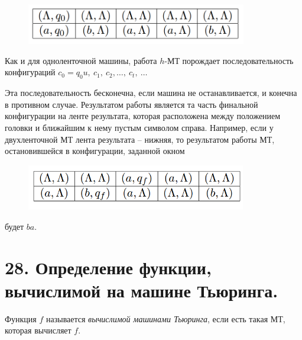 \begin{figure}[h]
	\begin{center}
		\begin{minipage}[h]{0.6\linewidth}
			\includegraphics[height=1.75cm, width=\linewidth]{images/TabMT.png}
		\end{minipage}
	\end{center}
\end{figure}

Как и для одноленточной машины, работа $h$-МТ порождает последовательность конфигураций $c_0 = q_0u,\ c_1,\ c_2, \ldots ,\ c_t,\ \ldots$

Эта последовательность бесконечна, если машина не останавливается, и конечна в противном случае. Результатом работы является та часть финальной конфигурации на ленте результата, которая расположена между положением головки и ближайшим к нему пустым символом справа. Например, если у двухленточной МТ
лента результата -- нижняя, то результатом работы МТ, остановившейся в конфигурации, заданной окном

\begin{figure}[h]
	\begin{center}
		\begin{minipage}[h]{0.6\linewidth}
			\includegraphics[height=2cm, width=\linewidth]{images/Tab2MT.png}
		\end{minipage}
	\end{center}
\end{figure}

будет $ba$.

\section*{28.  Определение функции, вычислимой на машине Тьюринга.}


Функция $f$ называется \textit{вычислимой машинами Тьюринга}, если есть такая МТ, которая вычисляет $f$.




